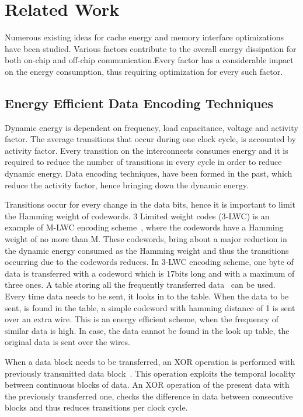 \section{Related Work}
\label{section:related}
Numerous existing ideas for cache energy and memory interface optimizations have been studied. Various factors contribute to the overall energy dissipation for both on-chip and off-chip communication.Every factor has a considerable impact on the energy consumption, thus requiring optimization for every such factor.  
 
\subsection{Energy Efficient Data Encoding Techniques}
Dynamic energy is dependent on frequency, load capacitance, voltage and activity factor. The average transitions that occur during one clock cycle, is accounted by activity factor. Every transition on the interconnects consumes energy and it is required to reduce the number of transitions in every cycle in order to reduce dynamic energy. Data encoding techniques, have been formed in the past, which reduce the activity factor, hence bringing down the dynamic energy.

Transitions occur for every change in the data bits, hence it is important to limit the Hamming weight of codewords. 3 Limited weight codes (3-LWC) is an example of M-LWC encoding scheme~\cite{limitedweight}, where the codewords have a Hamming weight of no more than M. These codewords, bring about a major reduction in the dynamic energy consumed as the Hamming weight and thus the transitions occurring due to the codewords reduces. In 3-LWC encoding scheme, one byte of data is transferred with a codeword which is 17bits long and with a maximum of three ones. A table storing all the frequently transferred data~\cite{frequentencoding} can be used. Every time data needs to be sent, it looks in to the table. When the data to be sent, is found in the table, a simple codeword with hamming distance of 1 is sent over an extra wire. This is an energy efficient scheme, when the frequency of similar data is high. In case, the data cannot be found in the look up table, the original data is sent over the wires.

When a data block needs to be transferred, an XOR operation is performed with previously transmitted data block~\cite{XORencoding}. This operation exploits the temporal locality between continuous blocks of data. An XOR operation of the present data with the previously transferred one, checks the difference in data between consecutive blocks and thus reduces transitions per clock cycle.  

